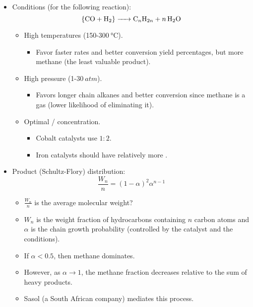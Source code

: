 \documentclass[../notes.tex]{subfiles}
\begin{document}
\begin{itemize}
\begin{itemize}
\begin{itemize}
        \end{itemize}
    \end{itemize}
    \item Conditions (for the following reaction):
    \begin{equation*}
        \ce{\{CO + H2\} -> C_nH_{2n} + $n$H2O}
    \end{equation*}
    \begin{itemize}
        \item High temperatures (150-$\SI{300}{\celsius}$).
        \begin{itemize}
            \item Favor faster rates and better conversion yield percentages, but more methane (the least valuable product).
        \end{itemize}
        \item High pressure (1-$\SI{30}{atm}$).
        \begin{itemize}
            \item Favors longer chain alkanes and better conversion since methane is a gas (lower likelihood of eliminating it).
        \end{itemize}
        \item Optimal  /  concentration.
        \begin{itemize}
            \item Cobalt catalysts use $1:2$.
            \item Iron catalysts should have relatively more .
        \end{itemize}
    \end{itemize}
    \item Product (Schultz-Flory) distribution:
    \begin{equation*}
        \frac{W_n}{n} = (1-\alpha)^2\alpha^{n-1}
    \end{equation*}
    \begin{itemize}
        \item $\frac{W_n}{n}$ is the average molecular weight?
        \item $W_n$ is the weight fraction of hydrocarbons containing $n$ carbon atoms and $\alpha$ is the chain growth probability (controlled by the catalyst and the conditions).
        \item If $\alpha<0.5$, then methane dominates.
        \item However, as $\alpha\to 1$, the methane fraction decreases relative to the sum of heavy products.
        \item Sasol (a South African company) mediates this process.

\end{itemize}
\end{itemize}
\end{document}
